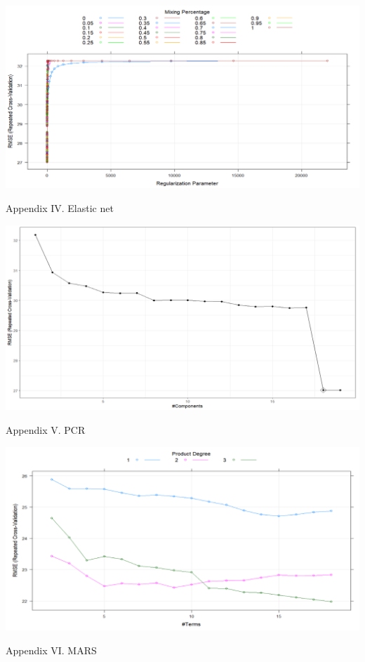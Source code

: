 \documentclass[
]{article}
\begin{document}
\begin{center}\includegraphics[width=0.9\linewidth,height=0.7\textheight]{primary_analysis_plot/elastic_net_plot} \end{center}
\begin{center}
Appendix IV. Elastic net
\end{center}

\begin{center}\includegraphics[width=0.9\linewidth,height=0.7\textheight]{primary_analysis_plot/pcr_plot} \end{center}
\begin{center}
Appendix V. PCR
\end{center}

\begin{center}\includegraphics[width=0.9\linewidth,height=0.7\textheight]{primary_analysis_plot/mars_plot} \end{center}
\begin{center}
Appendix VI. MARS
\end{center}
\end{document}
